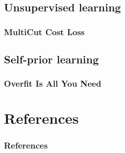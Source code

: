 \documentclass{beamer}
\begin{document}
\subsection{Unsupervised learning}

\begin{frame}
    \frametitle{MultiCut Cost Loss}

\end{frame}

\subsection{Self-prior learning}

\begin{frame}
    \frametitle{Overfit Is All You Need}



\end{frame}

\section*{References}

\begin{frame}[allowframebreaks]
    \frametitle{References}

    
    
\end{frame}
\end{document}
